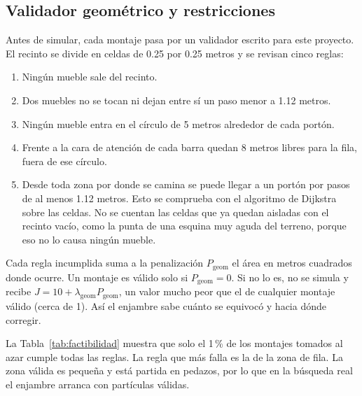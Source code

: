 \documentclass[11pt,letterpaper]{article}
\begin{document}
\subsection{Validador geométrico y restricciones}
Antes de simular, cada montaje pasa por un validador escrito para este proyecto. El recinto se divide en celdas de 0.25 por 0.25 metros y se revisan cinco reglas:
\begin{enumerate}
\item Ningún mueble sale del recinto.
\item Dos muebles no se tocan ni dejan entre sí un paso menor a 1.12 metros.
\item Ningún mueble entra en el círculo de 5 metros alrededor de cada portón.
\item Frente a la cara de atención de cada barra quedan 8 metros libres para la fila, fuera de ese círculo.
\item Desde toda zona por donde se camina se puede llegar a un portón por pasos de al menos 1.12 metros. Esto se comprueba con el algoritmo de Dijkstra sobre las celdas. No se cuentan las celdas que ya quedan aisladas con el recinto vacío, como la punta de una esquina muy aguda del terreno, porque eso no lo causa ningún mueble.
\end{enumerate}
Cada regla incumplida suma a la penalización $P_{\text{geom}}$ el área en metros cuadrados donde ocurre. Un montaje es válido solo si $P_{\text{geom}} = 0$. Si no lo es, no se simula y recibe $J = 10 + \lambda_{\text{geom}} P_{\text{geom}}$, un valor mucho peor que el de cualquier montaje válido (cerca de 1). Así el enjambre sabe cuánto se equivocó y hacia dónde corregir.

La Tabla~\ref{tab:factibilidad} muestra que solo el 1\,\% de los montajes tomados al azar cumple todas las reglas. La regla que más falla es la de la zona de fila. La zona válida es pequeña y está partida en pedazos, por lo que en la búsqueda real el enjambre arranca con partículas válidas.

\begin{table}[H]
\centering
\caption{Montajes al azar frente al validador y búsqueda de un montaje válido con PSO.}
\label{tab:factibilidad}

\end{table}
\end{document}
